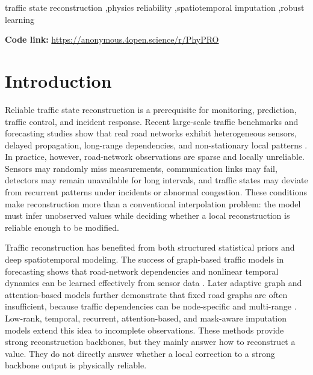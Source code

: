 \documentclass[preprint,12pt]{elsarticle}
\begin{document}
\begin{frontmatter}
\begin{abstract}
\end{abstract}

\begin{keyword}
traffic state reconstruction \sep physics reliability \sep spatiotemporal imputation \sep robust learning
\par\smallskip\textbf{Code link:} \url{https://anonymous.4open.science/r/PhyPRO}
\end{keyword}

\end{frontmatter}

\section{Introduction}
Reliable traffic state reconstruction is a prerequisite for monitoring, prediction, traffic control, and incident response. Recent large-scale traffic benchmarks and forecasting studies show that real road networks exhibit heterogeneous sensors, delayed propagation, long-range dependencies, and non-stationary local patterns \citep{liu2023largest,jiang2023pdformer}. In practice, however, road-network observations are sparse and locally unreliable. Sensors may randomly miss measurements, communication links may fail, detectors may remain unavailable for long intervals, and traffic states may deviate from recurrent patterns under incidents or abnormal congestion. These conditions make reconstruction more than a conventional interpolation problem: the model must infer unobserved values while deciding whether a local reconstruction is reliable enough to be modified.

Traffic reconstruction has benefited from both structured statistical priors and deep spatiotemporal modeling. The success of graph-based traffic models in forecasting shows that road-network dependencies and nonlinear temporal dynamics can be learned effectively from sensor data \citep{li2018dcrnn,wu2019graphwavenet}. Later adaptive graph and attention-based models further demonstrate that fixed road graphs are often insufficient, because traffic dependencies can be node-specific and multi-range \citep{bai2020agcrn,chen2020mrabgcn}. Low-rank, temporal, recurrent, attention-based, and mask-aware imputation models extend this idea to incomplete observations. These methods provide strong reconstruction backbones, but they mainly answer how to reconstruct a value. They do not directly answer whether a local correction to a strong backbone output is physically reliable.
\end{document}
